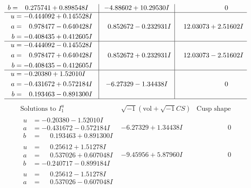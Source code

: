 \documentclass[1p]{elsarticle_modified}
\theoremstyle{definition}
\newcommand{\I}{\sqrt{-1}}
\begin{document}
$$\begin{array}{c|c|c}
\begin{aligned}
b &= \phantom{-}0.275741 + 0.898548 I\end{aligned}
 & -4.88602 + 10.29530 I & \phantom{-0.000000 } 0 \\ \hline\begin{aligned}
u &= -0.444092 + 0.145528 I \\
a &= \phantom{-}0.978477 - 0.640428 I \\
b &= -0.408435 + 0.412605 I\end{aligned}
 & \phantom{-}0.852672 - 0.232931 I & \phantom{-}12.03073 + 2.51602 I \\ \hline\begin{aligned}
u &= -0.444092 - 0.145528 I \\
a &= \phantom{-}0.978477 + 0.640428 I \\
b &= -0.408435 - 0.412605 I\end{aligned}
 & \phantom{-}0.852672 + 0.232931 I & \phantom{-}12.03073 - 2.51602 I \\ \hline\begin{aligned}
u &= -0.20380 + 1.52010 I \\
a &= -0.431672 + 0.572184 I \\
b &= \phantom{-}0.193463 - 0.891300 I\end{aligned}
 & -6.27329 - 1.34438 I & \phantom{-0.000000 } 0\\
 \hline 
 \end{array}$$\newpage$$\begin{array}{c|c|c}  
\text{Solutions to }I^u_{1}& \I (\text{vol} + \sqrt{-1}CS) & \text{Cusp shape}\\
 \hline 
\begin{aligned}
u &= -0.20380 - 1.52010 I \\
a &= -0.431672 - 0.572184 I \\
b &= \phantom{-}0.193463 + 0.891300 I\end{aligned}
 & -6.27329 + 1.34438 I & \phantom{-0.000000 } 0 \\ \hline\begin{aligned}
u &= \phantom{-}0.25612 + 1.51278 I \\
a &= \phantom{-}0.537026 + 0.607048 I \\
b &= -0.240717 - 0.899184 I\end{aligned}
 & -9.45956 + 5.87960 I & \phantom{-0.000000 } 0 \\ \hline\begin{aligned}
u &= \phantom{-}0.25612 - 1.51278 I \\
a &= \phantom{-}0.537026 - 0.607048 I \\

\end{aligned}
\end{array}$$
\end{document}
